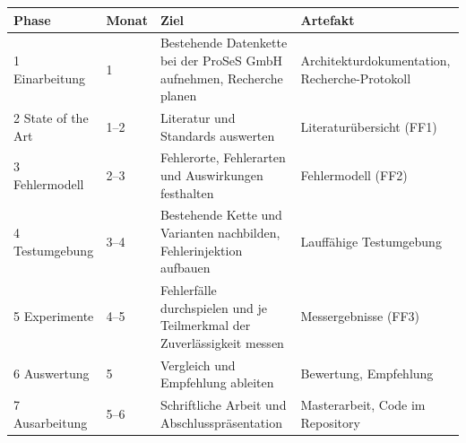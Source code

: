 \documentclass[11pt, a4paper]{article}
\begin{document}
\begin{center}
\small
\begin{tabularx}{\textwidth}{@{}l l X X@{}}
\toprule
\textbf{Phase} & \textbf{Monat} & \textbf{Ziel} & \textbf{Artefakt} \\
\midrule
1 Einarbeitung & 1 & Bestehende Datenkette bei der ProSeS GmbH aufnehmen, Recherche planen & Architekturdokumentation, Recherche-Protokoll \\
2 State of the Art & 1--2 & Literatur und Standards auswerten & Literaturübersicht (FF1) \\
3 Fehlermodell & 2--3 & Fehlerorte, Fehlerarten und Auswirkungen festhalten & Fehlermodell (FF2) \\
4 Testumgebung & 3--4 & Bestehende Kette und Varianten nachbilden, Fehlerinjektion aufbauen & Lauffähige Testumgebung \\
5 Experimente & 4--5 & Fehlerfälle durchspielen und je Teilmerkmal der Zuverlässigkeit messen & Messergebnisse (FF3) \\
6 Auswertung & 5 & Vergleich und Empfehlung ableiten & Bewertung, Empfehlung \\
7 Ausarbeitung & 5--6 & Schriftliche Arbeit und Abschlusspräsentation & Masterarbeit, Code im Repository \\
\bottomrule
\end{tabularx}
\end{center}

\printbibliography[heading=bibintoc, title={Literaturverzeichnis}]
\end{document}
